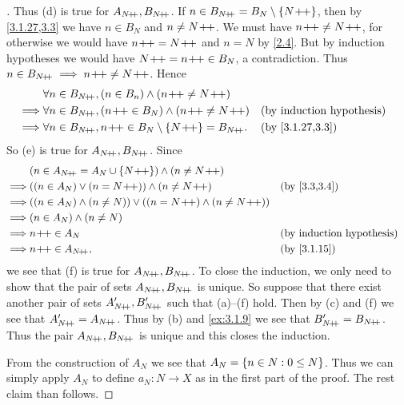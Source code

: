 \begin{proof}[]
	Thus (d) is true for \(A_{N\!+\!\!+}, B_{N\!+\!\!+}\).
	If \(n \in B_{N\!+\!\!+} = B_N \setminus \left\lbrace N\!+\!\!+\right\rbrace\), then by \cref{3.1.27,3.3} we have \(n \in B_N\) and \(n \neq N\!+\!\!+\).
	We must have \(n\!+\!\!+ \neq N\!+\!\!+\), for otherwise we would have \(n\!+\!\!+ = N\!+\!\!+\) and \(n = N\) by \cref{2.4}.
	But by induction hypotheses we would have \(N\!+\!\!+ = n\!+\!\!+ \in B_N\), a contradiction.
	Thus \(n \in B_{N\pp} \implies n\pp \neq N\pp\).
	Hence
	\begin{align*}
		         & \forall n \in B_{N\pp}, (n \in B_n) \land (n\pp \neq N\pp)                                 \\
		\implies & \forall n \in B_{N\pp}, (n\pp \in B_N) \land (n\pp \neq N\pp)         &  & \byIH           \\
		\implies & \forall n \in B_{N\pp}, n\pp \in B_N \setminus \set{N\pp} = B_{N\pp}. &  & \by{3.1.27,3.3}
	\end{align*}
	So (e) is true for \(A_{N\!+\!\!+}, B_{N\!+\!\!+}\).
	Since
	\begin{align*}
		         & (n \in A_{N\pp} = A_N \cup \set{N\pp}) \land (n \neq N\pp)                             \\
		\implies & ((n \in A_N) \lor (n = N\pp)) \land (n \neq N\pp)                    &  & \by{3.3,3.4} \\
		\implies & ((n \in A_N) \land (n \neq N)) \lor ((n = N\pp) \land (n \neq N\pp))                   \\
		\implies & (n \in A_N) \land (n \neq N)                                                           \\
		\implies & n\pp \in A_N                                                         &  & \byIH        \\
		\implies & n\pp \in A_{N\pp},                                                   &  & \by{3.1.15}
	\end{align*}
	we see that (f) is true for \(A_{N\!+\!\!+}, B_{N\!+\!\!+}\).
	To close the induction, we only need to show that the pair of sets \(A_{N\!+\!\!+}, B_{N\!+\!\!+}\) is unique.
	So suppose that there exist another pair of sets \(A_{N\!+\!\!+}', B_{N\!+\!\!+}'\) such that (a)--(f) hold.
	Then by (c) and (f) we see that \(A_{N\!+\!\!+}' = A_{N\!+\!\!+}\).
	Thus by (b) and \cref{ex:3.1.9} we see that \(B_{N\!+\!\!+}' = B_{N\!+\!\!+}\).
	Thus the pair \(A_{N\!+\!\!+}, B_{N\!+\!\!+}\) is unique and this closes the induction.

	From the construction of \(A_N\) we see that \(A_N = \left\lbrace n \in N : 0 \leq N\right\rbrace\).
	Thus we can simply apply \(A_N\) to define \(a_N : N \to X\) as in the first part of the proof.
	The rest claim than follows.
\end{proof}

